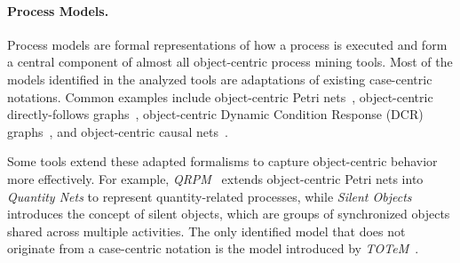 \paragraph{Process Models.}

Process models are formal representations of how a process is executed and form a central component of almost all object-centric process mining tools. Most of the models identified in the analyzed tools are adaptations of existing case-centric notations. Common examples include object-centric Petri nets~\cite{ocpi, pm4py, ocpa}, object-centric directly-follows graphs~\cite{proact, pm4py}, object-centric Dynamic Condition Response (DCR) graphs~\cite{ocdm}, and object-centric causal nets~\cite{occnet}.

Some tools extend these adapted formalisms to capture object-centric behavior more effectively. For example, \textit{QRPM}~\cite{qrpm} extends object-centric Petri nets into \textit{Quantity Nets} to represent quantity-related processes, while \textit{Silent Objects}~\cite{silentobjects} introduces the concept of silent objects, which are groups of synchronized objects shared across multiple activities. The only identified model that does not originate from a case-centric notation is the model introduced by \textit{TOTeM}~\cite{totem}.

